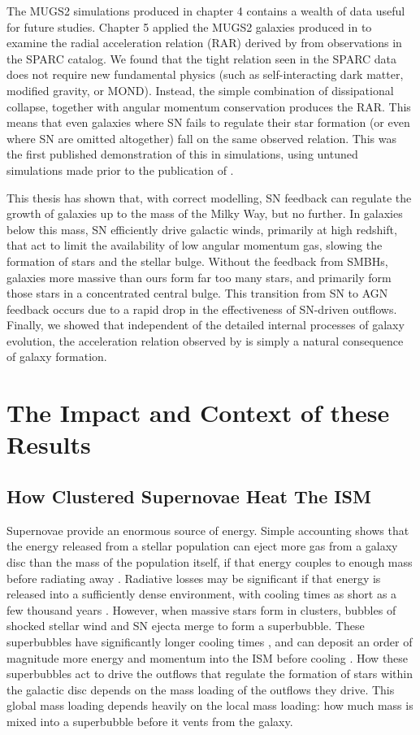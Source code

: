 The MUGS2 simulations produced in chapter 4 contains a wealth of data useful for
future studies. Chapter 5 applied the MUGS2 galaxies produced in
\citet{Keller2016a} to examine the radial acceleration relation (RAR) derived by
\citet{McGaugh2016} from observations in the SPARC \citep{Lelli2016b} catalog.
We found that the tight relation seen in the SPARC data does not require new
fundamental physics (such as self-interacting dark matter, modified gravity, or
MOND).  Instead, the simple combination of dissipational collapse, together with
angular momentum conservation produces the RAR. This means that even galaxies
where SN fails to regulate their star formation (or even where SN are omitted
altogether) fall on the same observed relation.  This was the first published
demonstration of this in simulations, using untuned simulations made prior to
the publication of \citet{McGaugh2016}.

This thesis has shown that, with correct modelling, SN feedback can regulate the
growth of galaxies up to the mass of the Milky Way, but no further.  In galaxies
below this mass, SN efficiently drive galactic winds, primarily at
high redshift, that act to limit the availability of low angular momentum gas,
slowing the formation of stars and the stellar bulge. Without the
feedback from SMBHs, galaxies more massive than ours form far too many stars,
and primarily form those stars in a concentrated central bulge.  This transition
from SN to AGN feedback occurs due to a rapid drop in the effectiveness of
SN-driven outflows.  Finally, we showed that independent of the detailed
internal processes of galaxy evolution, the acceleration relation observed by
\citet{McGaugh2016} is simply a natural consequence of galaxy formation.

\section{The Impact and Context of these Results}
\subsection{How Clustered Supernovae Heat The ISM}
Supernovae provide an enormous source of energy.  Simple accounting shows that
the energy released from a stellar population can eject more gas from a galaxy
disc than the mass of the population itself, if that energy couples to enough
mass before radiating away \citep{Larson1974}.  Radiative losses may be
significant if that energy is released into a sufficiently dense environment,
with cooling times as short as a few thousand years \citep{Chevalier1974}.
However, when massive stars form in clusters, bubbles of shocked stellar wind
and SN ejecta merge to form a superbubble.  These superbubbles have
significantly longer cooling times \citep{MacLow1988}, and can deposit an order
of magnitude more energy and momentum into the ISM before cooling
\citet{Gentry2017}.  How these superbubbles act to drive the 
outflows that regulate the formation of stars within the galactic disc depends
on the mass loading of the outflows they drive.  This global mass loading
depends heavily on the local mass loading: how much mass is mixed into a
superbubble before it vents from the galaxy.

